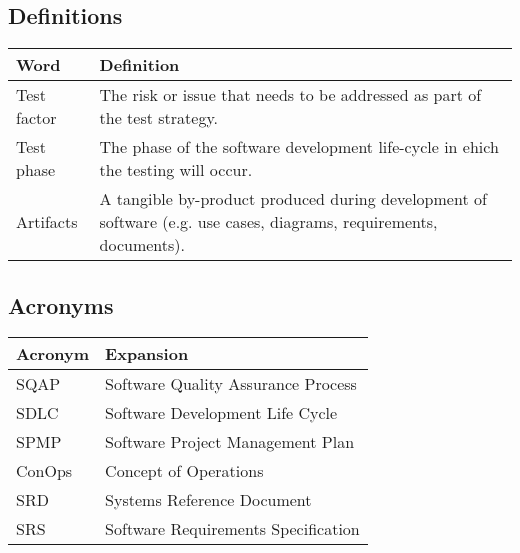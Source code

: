 \documentclass[a3paper, 11pt]{article}
\begin{document}
\subsection{Definitions}
	\begin{tabular}{|p{2cm}|p{13.4cm}|}
		\hline
		\textbf{Word} & \textbf{Definition} \\ \hline
		Test factor & The risk or issue that needs to be addressed as part of the test strategy. \\ \hline
		Test phase & The phase of the software development life-cycle in ehich the testing will occur.  \\ \hline
		Artifacts & A tangible by-product produced during development of software (e.g. use cases, diagrams, requirements, documents). \\ \hline
	\end{tabular}

\subsection {Acronyms}
	\begin{tabular} {|p{2cm}|p{13.4cm}|}
		\hline
		\textbf{Acronym} & \textbf{Expansion} \\ \hline
		SQAP & Software Quality Assurance Process \\ \hline
		SDLC & Software Development Life Cycle \\ \hline
		SPMP & Software Project Management Plan \\ \hline
		ConOps & Concept of Operations \\ \hline
		SRD & Systems Reference Document \\ \hline
		SRS & Software Requirements Specification \\ \hline
	\end{tabular}
\end{document}
